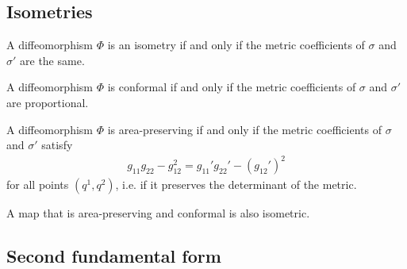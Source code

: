 \subsection{Isometries}

    \begin{property}\label{diff:isometry}
        A diffeomorphism $\Phi$ is an isometry if and only if the metric coefficients of $\sigma$ and $\sigma'$ are the same.
    \end{property}

    \begin{property}
        A diffeomorphism $\Phi$ is conformal if and only if the metric coefficients of $\sigma$ and $\sigma'$ are proportional.
    \end{property}

    \begin{property}
        A diffeomorphism $\Phi$ is area-preserving if and only if the metric coefficients of $\sigma$ and $\sigma'$ satisfy
        \begin{gather}
            g_{11}g_{22} - g_{12}^2 = g_{11}'g_{22}' - (g_{12}')^2
        \end{gather}
        for all points $(q^1,q^2)$, i.e. if it preserves the determinant of the metric.
    \end{property}
    \begin{result}
        A map that is area-preserving and conformal is also isometric.
    \end{result}

\subsection{Second fundamental form}

